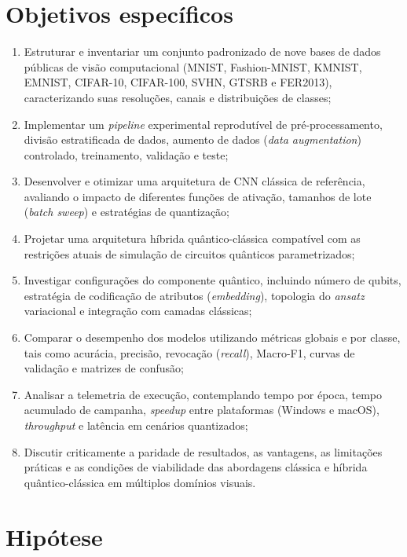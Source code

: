 \documentclass[
    12pt,
    openright,
    oneside,
    a4paper,
    english,
    brazil
]{abntex2}
\begin{document}
\section{Objetivos específicos}

\begin{enumerate} 
    \item Estruturar e inventariar um conjunto padronizado de nove bases de dados públicas de visão computacional (MNIST, Fashion-MNIST, KMNIST, EMNIST, CIFAR-10, CIFAR-100, SVHN, GTSRB e FER2013), caracterizando suas resoluções, canais e distribuições de classes;
    \item Implementar um \textit{pipeline} experimental reprodutível de pré-processamento, divisão estratificada de dados, aumento de dados (\textit{data augmentation}) controlado, treinamento, validação e teste;
    \item Desenvolver e otimizar uma arquitetura de CNN clássica de referência, avaliando o impacto de diferentes funções de ativação, tamanhos de lote (\textit{batch sweep}) e estratégias de quantização;
    \item Projetar uma arquitetura híbrida quântico-clássica compatível com as restrições atuais de simulação de circuitos quânticos parametrizados;
    \item Investigar configurações do componente quântico, incluindo número de qubits, estratégia de codificação de atributos (\textit{embedding}), topologia do \textit{ansatz} variacional e integração com camadas clássicas;
    \item Comparar o desempenho dos modelos utilizando métricas globais e por classe, tais como acurácia, precisão, revocação (\textit{recall}), Macro-F1, curvas de validação e matrizes de confusão;
    \item Analisar a telemetria de execução, contemplando tempo por época, tempo acumulado de campanha, \textit{speedup} entre plataformas (Windows e macOS), \textit{throughput} e latência em cenários quantizados;
    \item Discutir criticamente a paridade de resultados, as vantagens, as limitações práticas e as condições de viabilidade das abordagens clássica e híbrida quântico-clássica em múltiplos domínios visuais.
\end{enumerate}

\section{Hipótese}
\end{document}
